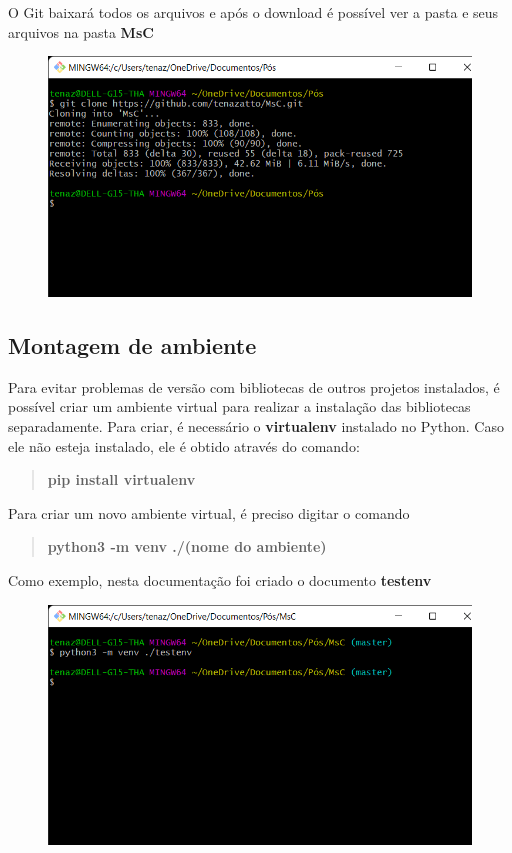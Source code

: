 \documentclass[Portugues,Final]{ic-tese-v3}
\begin{document}
O Git baixará todos os arquivos e após o download é possível ver a pasta e seus arquivos na pasta \textbf{MsC}

\begin{figure}[h!]
\centering
\includegraphics[scale=0.4]{images/doc-install/git-clone.png}
\label{fig:DocInstallGitClone}
\end{figure}

\subsection{Montagem de ambiente}

Para evitar problemas de versão com bibliotecas de outros projetos instalados, é possível criar um ambiente virtual para realizar a instalação das bibliotecas separadamente. Para criar, é necessário o \textbf{virtualenv} instalado no Python. Caso ele não esteja instalado, ele é obtido através do comando:

\begin{quote}\textbf{pip install virtualenv}\end{quote}

Para criar um novo ambiente virtual, é preciso digitar o comando

\begin{quote}\textbf{python3 -m venv ./(nome do ambiente)}\end{quote}

Como exemplo, nesta documentação foi criado o documento \textbf{testenv}

\begin{figure}[H]
\centering
\includegraphics[scale=0.4]{images/doc-install/virtualenv-sh.png}
\label{fig:DocInstallVirtualEnvShell}
\end{figure}
\end{document}
